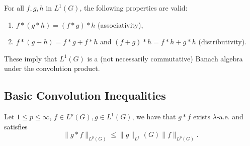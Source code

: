 \begin{proposition}
  For all $f,g,h$ in $L^{1}(G)$, the following properties are valid:
  \begin{enumerate}
    \item $f*(g* h)=(f* g)* h$ (associativity),
    \item $f* (g+h)=f* g+f*h$ and $(f+g)*h=f*h+g*h$ (distributivity).
  \end{enumerate}
These imply that $L^{1}(G)$ is a (not necessarily commutative) Banach algebra under the convolution product.
\end{proposition}
\subsection{Basic Convolution Inequalities}
\begin{theorem}
  Let $1\le p\le \infty$, $f\in L^{p}(G), g\in L^{1}(G) $, we have that $g*f$ exists $\lambda$-a.e. and satisfies
  \begin{equation}
    \|g*f\|_{L^{p}(G)}\le \|g\|_{L^{1}}(G)\|f\|_{L^{p}(G)}.
  \end{equation}
\end{theorem}
